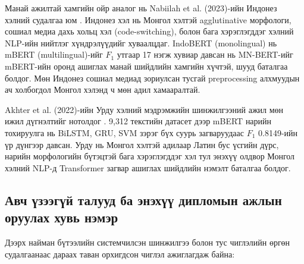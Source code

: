 Манай ажилтай хамгийн ойр аналог нь Nabiilah et al. (2023)-ийн Индонез хэлний
судалгаа юм \cite{nabiilah2023bert}. Индонез хэл нь Монгол хэлтэй agglutinative
морфологи, сошиал медиа дахь хольц хэл (code-switching), болон бага хэрэглэгддэг
хэлний NLP-ийн нийтлэг хүндрэлүүдийг хуваалцдаг. IndoBERT (monolingual) нь
mBERT (multilingual)-ийг $F_1$ утгаар 17 нэгж хувиар давсан нь MN-BERT-ийг
mBERT-ийн оронд ашиглах манай шийдлийн хамгийн хүчтэй, шууд баталгаа болдог.
Мөн Индонез сошиал медиад зориулсан тусгай preprocessing алхмуудын ач холбогдол
Монгол хэлэнд ч мөн адил хамааралтай.

Akhter et al. (2022)-ийн Урду хэлний мэдрэмжийн шинжилгээний ажил мөн ижил
дүгнэлтийг нотолдог \cite{akhter2022multi}. 9,312 текстийн датасет дээр mBERT
нарийн тохируулга нь BiLSTM, GRU, SVM зэрэг бүх суурь загваруудаас $F_1$ 0.8149-ийн
үр дүнгээр давсан. Урду нь Монгол хэлтэй адилаар Латин бус үсгийн дүрс, нарийн
морфологийн бүтэцтэй бага хэрэглэгддэг хэл тул энэхүү олдвор Монгол хэлний
NLP-д Transformer загвар ашиглах шийдлийн нэмэлт баталгаа болдог.

\subsection{Авч үзээгүй талууд ба энэхүү дипломын ажлын оруулах хувь нэмэр}

Дээрх найман бүтээлийн системчилсэн шинжилгээ болон тус чиглэлийн өргөн
судалгаанаас дараах таван орхигдсон чиглэл ажиглагдаж байна:

